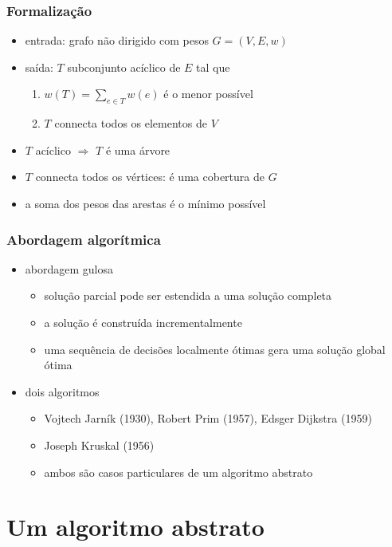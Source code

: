 \documentclass{beamer}
\begin{document}
\begin{frame}
\frametitle{Formalização}

\begin{itemize}
\item entrada: grafo não dirigido com pesos $G = (V, E, w)$
\item saída: $T$ subconjunto acíclico de $E$ tal que
\begin{enumerate}
\item $w(T) = \sum_{e \in T} w(e)$ é o menor possível
\item $T$ connecta todos os elementos de $V$
\end{enumerate}
\item $T$ acíclico $\Rightarrow$ $T$ é uma \alert{árvore}
\item $T$ connecta todos os vértices: é uma \alert{cobertura} de $G$
\item a soma dos pesos das arestas é o \alert{mínimo} possível
\end{itemize}
\end{frame}

\begin{frame}
\frametitle{Abordagem algorítmica}

\begin{itemize}
\item abordagem \alert{gulosa}
\begin{itemize}
\item solução parcial pode ser estendida a uma solução completa
\item a solução é construída incrementalmente
\item uma sequência de decisões localmente ótimas gera uma solução global ótima
\end{itemize}
\item dois algoritmos
\begin{itemize}
\item Vojtech Jarník (1930), Robert \alert{Prim} (1957), Edsger Dijkstra (1959)
\item Joseph \alert{Kruskal} (1956)
\item ambos são casos particulares de um algoritmo abstrato
\end{itemize}
\end{itemize}
\end{frame}

\section{Um algoritmo abstrato}
\end{document}
